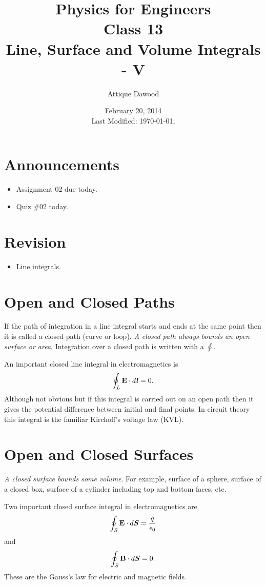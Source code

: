 \documentclass[12pt,a4paper]{article}
\title{\vspace{-2cm}Physics for Engineers\\Class 13\\Line, Surface and Volume Integrals - V}
\author{Attique Dawood}
\date{February 20, 2014\\[0.2cm] Last Modified: \today, \currenttime}
\begin{document}
\maketitle
\section{Announcements}
\begin{itemize}
\item Assignment 02 due today.
\item Quiz \#02 today.
\end{itemize}
\section{Revision}
\begin{itemize}
\item Line integrals.
\end{itemize}
\section{Open and Closed Paths}
If the path of integration in a line integral starts and ends at the same point then it is called a closed path (curve or loop). \textit{A closed path always bounds an open surface or area}. Integration over a closed path is written with a $\oint$.

An important closed line integral in electromagnetics is
\begin{equation}
\oint_L \textbf{E}\cdot d\textbf{\textit{l}}=0.
\end{equation}
Although not obvious but if this integral is carried out on an open path then it gives the potential difference between initial and final points. In circuit theory this integral is the familiar Kirchoff's voltage law (KVL).
\section{Open and Closed Surfaces}
\textit{A closed surface bounds some volume}. For example, surface of a sphere, surface of a closed box, surface of a cylinder including top and bottom faces, etc.

Two important closed surface integral in electromagnetics are
\begin{equation}
\oint_S \textbf{E}\cdot d\textbf{\textit{S}}=\dfrac{q}{\epsilon_0}
\end{equation}
and
\begin{equation}
\oint_S \textbf{B}\cdot d\textbf{\textit{S}}=0.
\end{equation}
These are the Gauss's law for electric and magnetic fields.
\end{document}
